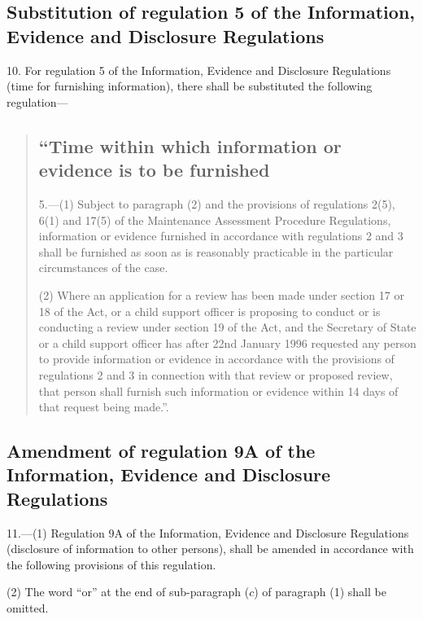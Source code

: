 \documentclass[12pt,a4paper]{article}
\begin{document}
\subsection[10. Substitution of regulation 5 of the Information, Evidence and Disclosure Regulations]{Substitution of regulation 5 of the Information, Evidence and Disclosure Regulations}

10.  For regulation 5 of the Information, Evidence and Disclosure Regulations (time for furnishing information), there shall be substituted the following regulation—
\begin{quotation}
\subsection*{“Time within which information or evidence is to be furnished}

5.—(1) Subject to paragraph (2) and the provisions of regulations 2(5), 6(1) and 17(5) of the Maintenance Assessment Procedure Regulations, information or evidence furnished in accordance with regulations 2 and 3 shall be furnished as soon as is reasonably practicable in the particular circumstances of the case.

(2) Where an application for a review has been made under section 17 or 18 of the Act, or a child support officer is proposing to conduct or is conducting a review under section 19 of the Act, and the Secretary of State or a child support officer has after 22nd January 1996 requested any person to provide information or evidence in accordance with the provisions of regulations 2 and 3 in connection with that review or proposed review, that person shall furnish such information or evidence within 14 days of that request being made.”.
\end{quotation}

\subsection[11. Amendment of regulation 9A of the Information, Evidence and Disclosure Regulations]{Amendment of regulation 9A of the Information, Evidence and Disclosure Regulations}

11.—(1) Regulation 9A of the Information, Evidence and Disclosure Regulations (disclosure of information to other persons), shall be amended in accordance with the following provisions of this regulation.

(2) The word “or” at the end of sub-paragraph ($c$) of paragraph (1) shall be omitted.
\end{document}
